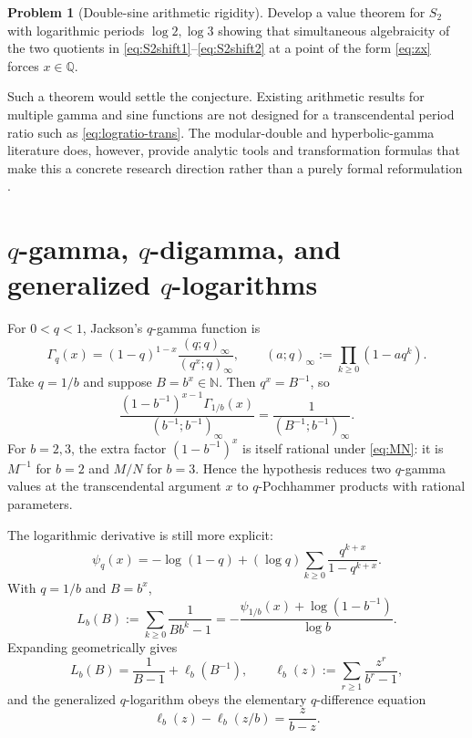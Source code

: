 \documentclass[11pt]{article}
\numberwithin{equation}{section}
\theoremstyle{definition}
\newtheorem{problem}[theorem]{Problem}
\theoremstyle{remark}
\newcommand{\Q}{\mathbb{Q}}
\newcommand{\N}{\mathbb{N}}
\begin{document}
\begin{problem}[Double-sine arithmetic rigidity]
Develop a value theorem for $S_2$ with logarithmic periods $\log2,\log3$ showing that simultaneous algebraicity of the two quotients in \eqref{eq:S2shift1}--\eqref{eq:S2shift2} at a point of the form \eqref{eq:zx} forces $x\in\Q$.
\end{problem}

Such a theorem would settle the conjecture.  Existing arithmetic results for multiple gamma and sine functions are not designed for a transcendental period ratio such as \eqref{eq:logratio-trans}.  The modular-double and hyperbolic-gamma literature does, however, provide analytic tools and transformation formulas that make this a concrete research direction rather than a purely formal reformulation \cite{Barnes1901,Ruijsenaars2000,Kurokawa1991,Narukawa2004}.

\section{$q$-gamma, $q$-digamma, and generalized $q$-logarithms}
\label{sec:qgamma}

For $0<q<1$, Jackson's $q$-gamma function is
\begin{equation}
 \Gamma_q(x)=(1-q)^{1-x}\frac{(q;q)_\infty}{(q^x;q)_\infty},
 \qquad (a;q)_\infty:=\prod_{k\ge0}(1-aq^k).
 \label{eq:qgamma}
\end{equation}
Take $q=1/b$ and suppose $B=b^x\in\N$.  Then $q^x=B^{-1}$, so
\begin{equation}
 \frac{(1-b^{-1})^{x-1}\Gamma_{1/b}(x)}{(b^{-1};b^{-1})_\infty}
 =\frac1{(B^{-1};b^{-1})_\infty}.
 \label{eq:qpoch-reduction}
\end{equation}
For $b=2,3$, the extra factor $(1-b^{-1})^x$ is itself rational under \eqref{eq:MN}: it is $M^{-1}$ for $b=2$ and $M/N$ for $b=3$.  Hence the hypothesis reduces two $q$-gamma values at the transcendental argument $x$ to $q$-Pochhammer products with rational parameters.

The logarithmic derivative is still more explicit:
\begin{equation}
 \psi_q(x)=-\log(1-q)+(\log q)\sum_{k\ge0}\frac{q^{k+x}}{1-q^{k+x}}.
 \label{eq:qdigamma}
\end{equation}
With $q=1/b$ and $B=b^x$,
\begin{equation}
 L_b(B):=\sum_{k\ge0}\frac1{Bb^k-1}
 =-\frac{\psi_{1/b}(x)+\log(1-b^{-1})}{\log b}.
 \label{eq:Lb-qdigamma}
\end{equation}
Expanding geometrically gives
\begin{equation}
 L_b(B)=\frac1{B-1}+\ell_b(B^{-1}),\qquad
 \ell_b(z):=\sum_{r\ge1}\frac{z^r}{b^r-1},
 \label{eq:qlog}
\end{equation}
and the generalized $q$-logarithm obeys the elementary $q$-difference equation
\begin{equation}
 \ell_b(z)-\ell_b(z/b)=\frac{z}{b-z}.
 \label{eq:qlog-difference}
\end{equation}
\end{document}

